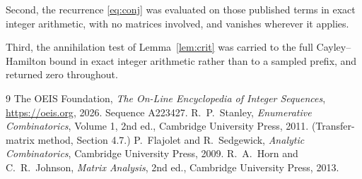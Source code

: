 \documentclass[11pt,a4paper]{article}
\theoremstyle{plain}
\theoremstyle{definition}
\begin{document}
Second, the recurrence \eqref{eq:conj} was evaluated on those published terms in exact
integer arithmetic, with no matrices involved, and vanishes wherever it applies.

Third, the annihilation test of Lemma~\ref{lem:crit} was carried to the full
Cayley--Hamilton bound in exact integer arithmetic rather than to a sampled prefix, and
returned zero throughout.

\begin{thebibliography}{9}
 The OEIS Foundation, \emph{The On-Line Encyclopedia of Integer
Sequences}, \url{https://oeis.org}, 2026. Sequence A223427.
 R.~P.~Stanley, \emph{Enumerative Combinatorics}, Volume 1, 2nd ed.,
Cambridge University Press, 2011. (Transfer-matrix method, Section 4.7.)
 P.~Flajolet and R.~Sedgewick, \emph{Analytic Combinatorics}, Cambridge
University Press, 2009.
 R.~A.~Horn and C.~R.~Johnson, \emph{Matrix Analysis}, 2nd ed., Cambridge
University Press, 2013.
\end{thebibliography}
\end{document}
